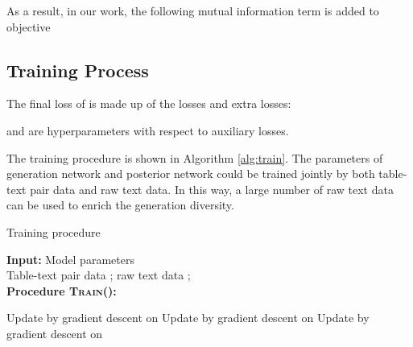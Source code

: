 As a result, in our work, the following mutual information term is added to objective










\subsection{Training Process}
The final loss of \method is made up of the  losses and extra losses:

 and  are hyperparameters with respect to auxiliary losses.

The training procedure is shown in Algorithm \ref{alg:train}.
The parameters of generation network  and posterior network  could be trained jointly by both table-text pair data and raw text data. In this way, a large number of raw text data can be used to enrich the generation diversity.

\begin{algorithm}[t]
\footnotesize
    \caption{Training procedure} \hspace*{0.02in} {\bf Input:} Model parameters \\
    \hspace*{0.49in}
    Table-text pair data ; raw text data ; \\
    \hspace*{0.02in} {\bf Procedure \textsc{Train}():}
    \begin{algorithmic}[1]
        \State \quad Update  by gradient descent on 
        \State \quad Update  by gradient descent on 
        \State \quad Update  by gradient descent on 
    \end{algorithmic}
    \label{alg:train}
\end{algorithm}
